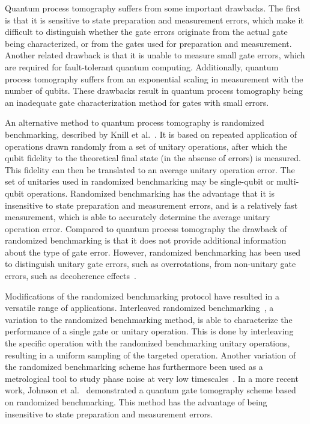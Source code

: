       Quantum process tomography suffers from some important drawbacks. The first is that it is sensitive to state preparation and measurement errors, which make it difficult to distinguish whether the gate errors originate from the actual gate being characterized, or from the gates used for preparation and measurement. Another related drawback is that it is unable to measure small gate errors, which are required for fault-tolerant quantum computing. Additionally, quantum process tomography suffers from an exponential scaling in measurement with the number of qubits. These drawbacks result in quantum process tomography being an inadequate gate characterization method for gates with small errors.

      An alternative method to quantum process tomography is randomized benchmarking, described by Knill et al.~\cite{knill2008randomized}. It is based on repeated application of operations drawn randomly from a set of unitary operations, after which the qubit fidelity to the theoretical final state (in the absense of errors) is measured. This fidelity can then be translated to an average unitary operation error. The set of unitaries used in randomized benchmarking may be single-qubit or multi-qubit operations. Randomized benchmarking has the advantage that it is insensitive to state preparation and measurement errors, and is a relatively fast measurement, which is able to accurately determine the average unitary operation error. Compared to quantum process tomography the drawback of randomized benchmarking is that it does not provide additional information about the type of gate error. However, randomized benchmarking has been used to distinguish unitary gate errors, such as overrotations, from non-unitary gate errors, such as decoherence effects~\cite{sheldon2015characterizing}.

      Modifications of the randomized benchmarking protocol have resulted in a versatile range of applications. Interleaved randomized benchmarking~\cite{magesan2012efficient}, a variation to the randomized benchmarking method, is able to characterize the performance of a single gate or unitary operation. This is done by interleaving the specific operation with the randomized benchmarking unitary operations, resulting in a uniform sampling of the targeted operation. Another variation of the randomized benchmarking scheme has furthermore been used as a metrological tool to study phase noise at very low timescales~\cite{omalley2015qubit}. In a more recent work, Johnson et al.~\cite{johnson2015demonstration} demonstrated a quantum gate tomography scheme based on randomized benchmarking. This method has the advantage of being insensitive to state preparation and measurement errors.

